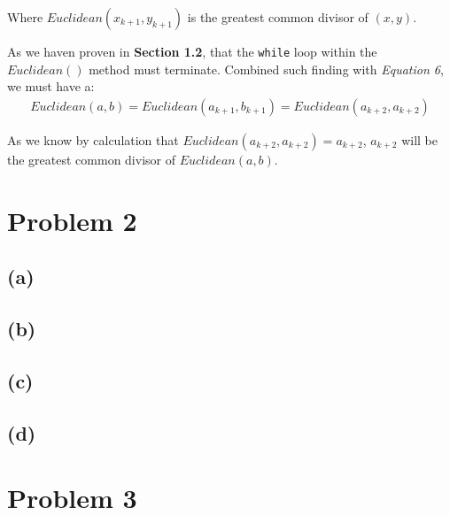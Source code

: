 \documentclass[12pt]{article}
\newcommand{\inlinecode}{\texttt}
\begin{document}
Where $Euclidean(x_{k+1}, y_{k+1})$ is the greatest common divisor of $(x, y)$.\newline


As we haven proven in \textbf{Section 1.2}, that the \inlinecode{while} loop within the $Euclidean()$ method must terminate. Combined such finding with \textit{Equation 6}, we must have a:
\begin{gather}
    Euclidean(a, b) = Euclidean(a_{k+1}, b_{k+1}) = Euclidean(a_{k+2}, a_{k+2})
\end{gather}

As we know by calculation that $Euclidean(a_{k+2}, a_{k+2}) = a_{k+2}$, $a_{k+2}$ will be the greatest common divisor of $Euclidean(a, b)$.

\section{Problem 2}
\subsection{(a)}
\subsection{(b)}
\subsection{(c)}
\subsection{(d)}

\section{Problem 3}


%
% 
% 
\end{document}
